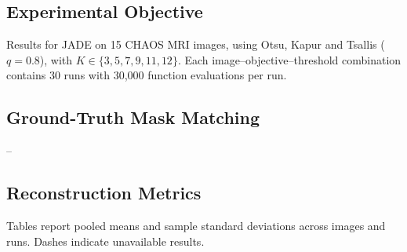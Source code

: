 \documentclass[review]{elsarticle}
\begin{document}
\subsection{Experimental Objective}

Results for JADE on 15 CHAOS MRI images, using Otsu, Kapur and Tsallis ($q=0.8$), with $K\in\{3,5,7,9,11,12\}$. Each image--objective--threshold combination contains 30 runs with 30,000 function evaluations per run.

\subsection{Ground-Truth Mask Matching}

--

\subsection{Reconstruction Metrics}

Tables report pooled means and sample standard deviations across images and runs. Dashes indicate unavailable results.

\begin{table}[htbp]
\centering
\small
\caption{PSNR (dB) on CHAOS MRI using Otsu: pooled mean $\pm$ sample standard deviation across 450 observations per entry (15 slices, 30 runs each). Dashes indicate unavailable results.}
\label{tab:chaos-otsu-psnr}
\end{table}
\end{document}
